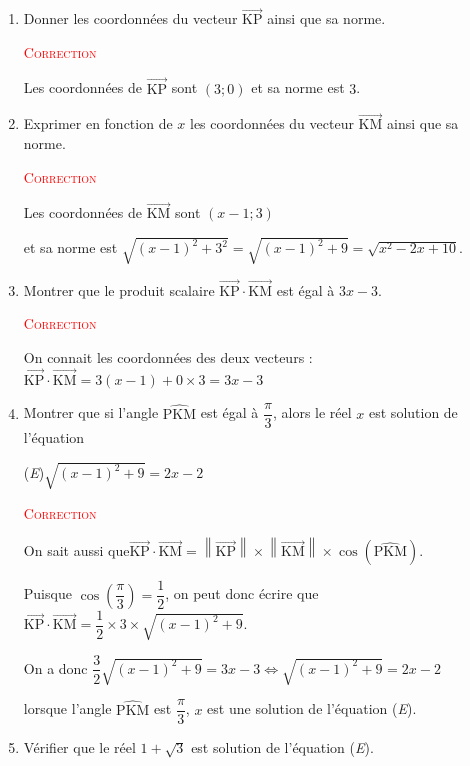 \documentclass[10pt]{article}
\providecommand{\vect}[1]{\overrightarrow{#1}}
\begin{document}
\begin{enumerate}
	\item Donner les coordonnées du vecteur \mbox{$\vect{\text{KP}}$} ainsi que sa norme.


	\textcolor{red}{\textsc{Correction}}


	Les coordonnées de $\vect{\text{KP}}$ sont 	\mbox{$(3;0)$}
	 et sa norme est $3$.
	\item Exprimer en fonction de $x$ les coordonnées du vecteur \mbox{$\vect{\text{KM}}$} ainsi que sa norme.




	\textcolor{red}{\textsc{Correction}}


	Les coordonnées de $\vect{\text{KM}}$ sont \mbox{$(x-1;3)$}

	et sa norme est \quad \mbox{$\sqrt{(x-1)^2+3^2}=\sqrt{(x-1)^2+9}=\sqrt{x^2-2x+10}$}.

	\item Montrer que le produit scalaire \mbox{$\vect{\text{KP}}\cdot\vect{\text{KM}}$} est égal à \mbox{$3x-3$.}

		\textcolor{red}{\textsc{Correction}}

		On connait les coordonnées des deux vecteurs : \quad \mbox{$\vect{\text{KP}}\cdot\vect{\text{KM}}=3(x-1)+0\times3=3x-3$}
	\item Montrer que si l'angle \ensuremath{\widehat{\text{PKM}}} est égal à \mbox{$\dfrac\pi 3$}, alors le réel $x$ est solution de l'équation

	\begin{center}
		(\textit{E})\hspace{10mm}\mbox{$\sqrt{(x-1)^2+9}=2x-2$}
	\end{center}



	\textcolor{red}{\textsc{Correction}}

	On sait aussi que\quad  \mbox{$\vect{\text{KP}}\cdot\vect{\text{KM}}=\left\|\overrightarrow{\text{KP}}\right\|\times\left\|\overrightarrow{\text{KM}}\right\|\times \cos(\widehat{\text{PKM}})$}.

	Puisque \quad \mbox{$\cos\left(\dfrac\pi 3\right)=\dfrac12$}, \quad on peut donc écrire que \quad \mbox{$\vect{\text{KP}}\cdot\vect{\text{KM}}=\dfrac12\times3\times\sqrt{(x-1)^2+9}$.}

	On a donc \quad \mbox{$\dfrac32 \sqrt{(x-1)^2+9}=3x-3\iff \sqrt{(x-1)^2+9}=2x-2$}

	lorsque l'angle \ensuremath{\widehat{\text{PKM}}} est \mbox{$\dfrac\pi 3$}, $x$ est une solution de l'équation (\textit{E}).
	\item Vérifier que le réel \mbox{$1+\sqrt3$} est solution de l'équation (\textit{E}).


\end{enumerate}
\end{document}
